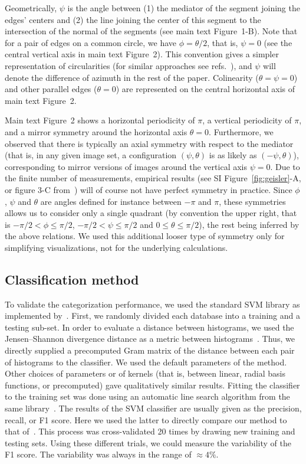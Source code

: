 \documentclass[a4paper]{article}
\newcounter{num}
\begin{document}
Geometrically, $\psi$ is the angle between 
(1) the mediator of the segment joining the edges' centers and 
(2) the line joining the center of this segment 
to the intersection of the normal of the segments (see  main text
Figure~1-B). %
Note that for a pair of edges on a common circle, 
we have $\phi=\theta/2$, that is, $\psi = 0$ (see the central vertical
axis in main text Figure~2).  This convention gives a simpler
representation of circularities (for similar approaches
see refs.~\autocite{Motoyoshi10,Sigman01,Hunt11}), and $\psi$ will denote
the difference of azimuth in the rest of the paper.  Colinearity
($\theta=\psi = 0$) and other parallel edges ($\theta = 0$)
are represented on the central horizontal axis of main text
Figure~2.

Main text Figure~2 shows a horizontal periodicity of $\pi$, a vertical
periodicity of $\pi$, and a mirror symmetry around the horizontal axis $\theta=0$. 
Furthermore, we observed that there is typically an axial symmetry 
with respect to the mediator
(that is, in any given image set, a configuration $(\psi, \theta)$ is
as likely as $(-\psi, \theta)$), corresponding to mirror versions of
images around the vertical axis $\psi=0$.
Due to the finite number of measurements, empirical results
(see SI Figure~\ref{fig:geisler}-A, or figure 3-C
from~\citet{Geisler01}) will of course not have perfect symmetry in practice.
Since $\phi$, $\psi$ and $\theta$ are angles defined 
for instance between $-\pi$ and $\pi$, these symmetries allows us to consider only a single quadrant 
(by convention the upper right, that is 
$-\pi/2 < \phi \leq \pi/2$,  $-\pi/2 < \psi \leq \pi/2$ and $0 \leq \theta \leq \pi/2$), 
the rest being inferred by the above relations. 
We used this additional looser type of symmetry only for simplifying
visualizations, not for the underlying calculations.

\subsection{Classification method}
\label{sec:SVM}
To validate the categorization performance, 
we used the standard SVM library as implemented by~\textcite{Pedregosa11}. 
First, we  randomly divided each database into a training and a testing sub-set.
In order to evaluate a distance between histograms, 
we used the Jensen--Shannon divergence distance
as a metric between histograms~\autocite{Cha02}. %
Thus, we directly supplied a precomputed Gram matrix of the distance 
between each pair of histograms to the classifier. 
We used the default parameters of the method. 
Other choices of parameters or of kernels 
(that is, between linear, radial basis functions, or precomputed) 
gave qualitatively similar results. 
Fitting the classifier to the training set was done using an 
automatic line search algorithm from the same library~\cite{Pedregosa11}.
The results of the SVM classifier are usually given as the precision, recall, or F1 score.
Here we used the latter  to directly compare our method to that of~\textcite{Serre07}.
This process was cross-validated 20 times 
by drawing new training and testing sets. 
Using these different trials,
we could measure the variability of the F1 score.
The variability was always in the range of $\approx 4\%$.
\end{document}
